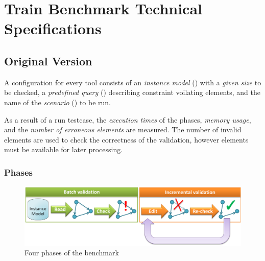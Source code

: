 \chapter{Train Benchmark Technical Specifications}


\section{Original Version}

A  configuration for every tool consists of an \emph{instance model} () with a \emph{given size} to be checked, a \emph{predefined query} () describing constraint voilating elements, and the name of the \emph{scenario} () to be run.

As a result of a run testcase, the \emph{execution times} of the phases, \emph{memory usage}, and the \emph{number of erroneous elements} are measured. The number of invalid elements are used to check the correctness of the validation, however elements must be available for later processing. 


\subsection{Phases}
\label{sec:phases}

\begin{figure}[Htb]
	\centering
	\includegraphics[scale=0.5]{figures/phases}
	\caption{Four phases of the benchmark}
	\label{fig:phases}
\end{figure}

